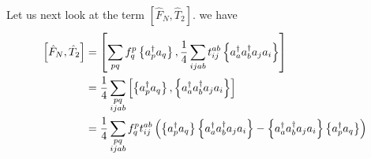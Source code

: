 Let us next look at the term $\left[ \hat{F}_N, \hat{T}_2 \right]$.
we have
    \begin{align*}
        \left[ \hat{F}_N, \hat{T}_2 \right] 
        &= \left[\sum_{pq} f_q^p \left\{a^\dagger_p a_q\right\},
            \frac{1}{4}\sum_{ijab} t_{ij}^{ab} \left\{a^\dagger_a a^\dagger_b a_j a_i\right\} \right] \\
        &= \frac{1}{4}\sum_{\substack{pq\\ijab}}
        \left[ \left\{a^\dagger_p a_q\right\}, \left\{a^\dagger_a a^\dagger_b a_j a_i\right\} \right] \\
        &= \frac{1}{4}\sum_{\substack{pq\\ijab}}
            f_q^p t_{ij}^{ab}
        \left( \left\{a^\dagger_p a_q\right\} \left\{a^\dagger_a a^\dagger_b a_j a_i\right\}
            - \left\{a^\dagger_a a^\dagger_b a_j a_i\right\} \left\{a^\dagger_p a_q\right\} \right)
    \end{align*}
